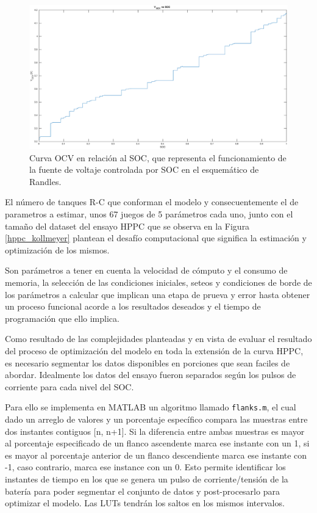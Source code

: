 \documentclass[10pt,a4paper]{article}
\newcounter{subsubsubsection}[subsubsection]
\begin{document}
\begin{figure}[h!]
    \begin{center}
        \includegraphics[width=.7\textwidth]{ocv_vs_soc.eps}
        \caption{Curva \acrshort{OCV} en relaci\'on al \acrshort{SOC}, que
            representa el funcionamiento de la fuente de voltaje controlada por
        \acrshort{SOC} en el esquem\'atico de Randles.}
    \end{center}
    \label{fig:ocv_vs_soc}
\end{figure}
\FloatBarrier

\label{flank_seg}

El número de tanques R-C que conforman el modelo y consecuentemente el de
parametros a estimar, unos 67 juegos de 5 parámetros cada uno, junto con el
tamaño del dataset del ensayo \acrshort{HPPC} que se observa en la Figura
\ref{hppc_kollmeyer} plantean el desafío computacional que significa la
estimación y optimización de los mismos. 

Son parámetros a tener en cuenta la velocidad de cómputo y el consumo de
memoria, la selección de las condiciones iniciales, seteos y condiciones de
borde de los parámetros a calcular que implican una etapa de
prueva y error hasta obtener un proceso funcional acorde a los resultados
deseados y el tiempo de programación que ello implica.

Como resultado de las complejidades planteadas y en vista de evaluar el resultado
del proceso de optimizaci\'on del modelo en toda la extensión de la curva
\acrshort{HPPC}, es necesario segmentar los datos disponibles en porciones que
sean faciles de abordar. Idealmente los datos del ensayo fueron separados según
los pulsos de corriente para cada nivel del \acrshort{SOC}. 

Para ello se implementa en MATLAB un algoritmo llamado \texttt{flanks.m}, el cual
dado un arreglo de valores y un porcentaje espec\'ifico compara las muestras
entre dos instantes contiguos [n, n+1]. Si la diferencia entre ambas muestras es
mayor al porcentaje especificado de un flanco ascendente marca ese instante con
un 1, si es mayor al porcentaje anterior de un flanco descendiente marca ese
instante con -1, caso contrario, marca ese instance con un 0. Esto permite
identificar los instantes de tiempo en los que se genera un pulso de
corriente/tensi\'on de la bater\'ia para poder segmentar el conjunto de datos y
post-procesarlo para optimizar el modelo. Las \acrshort{LUT}s tendrán los saltos
en los mismos intervalos.
\end{document}
